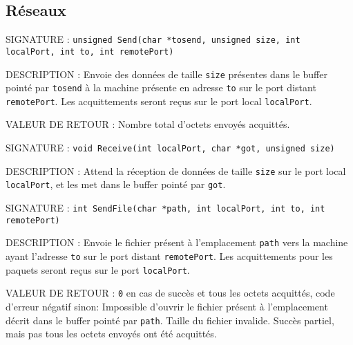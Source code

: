 \documentclass{article}
\begin{document}
	\subsection{Réseaux}
		\begin{description}
			\item{SIGNATURE : } \texttt{unsigned Send(char *tosend, unsigned size, int localPort, int to, int remotePort)}
			\item{DESCRIPTION : Envoie des données de taille \texttt{size} présentes dans le buffer pointé par \texttt{tosend} à la machine présente en adresse \texttt{to} sur le port distant \texttt{remotePort}. Les acquittements seront reçus sur le port local \texttt{localPort}.} 
			\item{VALEUR DE RETOUR : Nombre total d'octets envoyés acquittés.} 
		\end{description}
		\vspace{2.5mm}
		\begin{description}
			\item{SIGNATURE : } \texttt{void Receive(int localPort, char *got, unsigned size)}
			\item{DESCRIPTION : Attend la réception de données de taille \texttt{size} sur le port local \texttt{localPort}, et les met dans le buffer pointé par \texttt{got}.} 
		\end{description}
		\vspace{2.5mm}
		\begin{description}
			\item{SIGNATURE : } \texttt{int SendFile(char *path, int localPort, int to, int remotePort)}
			\item{DESCRIPTION : Envoie le fichier présent à l'emplacement \texttt{path} vers la machine ayant l'adresse \texttt{to} sur le port distant \texttt{remotePort}. Les acquittements pour les paquets seront reçus sur le port \texttt{localPort}.} 
			\item{VALEUR DE RETOUR : } \texttt{0} en cas de succès et tous les octets acquittés, code d'erreur négatif sinon: 
				 Impossible d'ouvrir le fichier présent à l'emplacement décrit dans le buffer pointé par \texttt{path}.
				 Taille du fichier invalide.
				 Succès partiel, mais pas tous les octets envoyés ont été acquittés.
		\end{description}
		\vspace{2.5mm}
\end{document}
